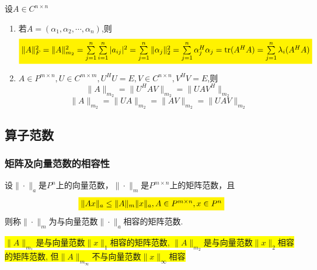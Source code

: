 \begin{theorem}
设$A\in C^{n\times n}$
\begin{enumerate}
	\item 若$A=(\alpha_1,\alpha_2,\cdots,\alpha_n)$,则
	\[
	 \colorbox{yellow}{$\| A\|_F^2=\| A\|_{m_2}^2=\sum\limits_{j=1}^{n}\sum\limits_{i=1}^{n}|a_{ij}|^2=\sum\limits_{j=1}^{n}\|\alpha_j\|^2_2=\sum\limits_{j=1}^{n}\alpha_j^H\alpha_j=\mathrm{tr}(A^HA)=\sum\limits_{j=1}^{n}\lambda_i(A^HA)$}
	\]
	\item$A\in P^{m\times n},U\in C^{m\times m},U^HU=E,V\in C^{n\times n},V^HV=E$,则
		\[
		\| A\|_{m_2}=\| U^HAV\|_{m_2}=\| UAV^H\|_{m_2}
		\]
		\[
		\| A\|_{m_2}=\| UA\|_{m_2}=\| AV\|_{m_2}=\| UAV\|_{m_2}
		\]	
\end{enumerate}

\end{theorem}

\subsection{算子范数}
\subsubsection{矩阵及向量范数的相容性}
\begin{definition}
	设$\|\cdot\|_a$是$P^n$上的向量范数，$\|\cdot\|_m$是$P^{m\times n}$上的矩阵范数，且
	\[
	\colorbox{yellow}{$\|Ax\|_a\leq \|A\|_m\|x\|_a, A\in P^{m\times n},x\in P^n$}
	\]
	则称$\|\cdot\|_m$为与向量范数$\|\cdot\|_a$相容的矩阵范数.
	
\end{definition}
\begin{note}
	\colorbox{yellow}{$\|A\|_{m_1}$是与向量范数$\|x\|_1$相容的矩阵范数, $\|A\|_{m_2}$是与向量范数$\|x\|_2$相容的矩阵范数, }
\colorbox{yellow}{但$\|A\|_{m_\infty}$不与向量范数$\|x\|_\infty$相容}
\end{note}

